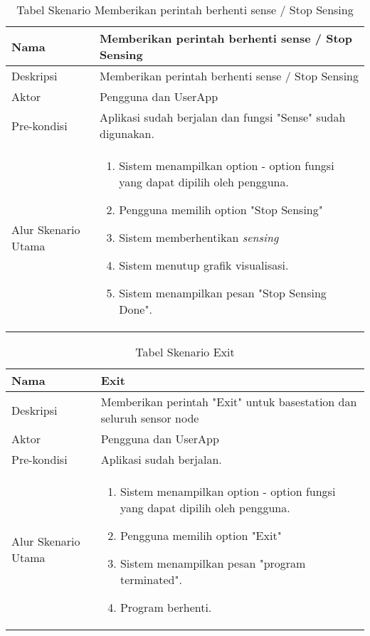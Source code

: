 \begin{table}[H]
    \centering
    \caption{Tabel Skenario Memberikan perintah berhenti sense / Stop Sensing}
    \begin{tabular}{|p{3cm}|p{10cm}|}
    \hline
        Nama & Memberikan perintah berhenti sense / Stop Sensing\\
    \hline 
    \hline
        Deskripsi & Memberikan perintah berhenti sense / Stop Sensing \\
    \hline
        Aktor & Pengguna dan UserApp\\
    \hline
        Pre-kondisi & Aplikasi sudah berjalan dan fungsi "Sense" sudah digunakan. \\
    \hline
        Alur Skenario Utama & 
         \begin{enumerate}
            \item Sistem menampilkan option - option fungsi yang dapat dipilih oleh pengguna.
            \item Pengguna memilih option "Stop Sensing"
            \item Sistem memberhentikan {\it sensing}
            \item Sistem menutup grafik visualisasi.
            \item Sistem menampilkan pesan "Stop Sensing Done". 
        \end{enumerate}\\
    \hline
    \end{tabular}
    \label{tab:skenario3}
\end{table}

\begin{table}[H]
    \centering
    \caption{Tabel Skenario Exit}
    \begin{tabular}{|p{3cm}|p{10cm}|}
    \hline
        Nama & Exit\\
    \hline 
    \hline
        Deskripsi & Memberikan perintah "Exit" untuk basestation dan seluruh sensor node\\
    \hline
        Aktor & Pengguna dan UserApp\\
    \hline
        Pre-kondisi & Aplikasi sudah berjalan. \\
    \hline
        Alur Skenario Utama & 
         \begin{enumerate}
            \item Sistem menampilkan option - option fungsi yang dapat dipilih oleh pengguna.
            \item Pengguna memilih option "Exit"
            \item Sistem menampilkan pesan "program terminated".
            \item Program berhenti. 
        \end{enumerate}\\
    \hline
    \end{tabular}
    \label{tab:skenario4}
\end{table}

